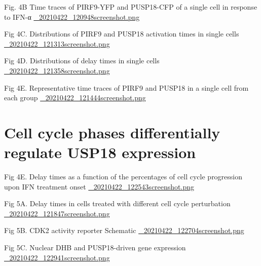 \documentclass[bigger]{beamer}
\begin{document}
\begin{frame}[label={sec:org4cd7d9c}]{Fig. 4B Time traces of PIRF9-YFP and PUSP18-CFP of a single cell in response to IFN-α}
\url{\_20210422\_120948screenshot.png}
\end{frame}

\begin{frame}[label={sec:org922249b}]{Fig 4C. Distributions of PIRF9 and PUSP18 activation times in single cells}
\url{\_20210422\_121313screenshot.png}
\end{frame}

\begin{frame}[label={sec:org0d51d52}]{Fig 4D. Distributions of delay times in single cells}
\url{\_20210422\_121358screenshot.png}
\end{frame}

\begin{frame}[label={sec:orgd564583}]{Fig 4E. Representative time traces of PIRF9 and PUSP18 in a single cell from each group}
\url{\_20210422\_121444screenshot.png}
\end{frame}

\section{Cell cycle phases differentially regulate USP18 expression}
\label{sec:orgb087d79}

\begin{frame}[label={sec:orgd25fd49}]{Fig 4E. Delay times as a function of the percentages of cell cycle progression upon IFN treatment onset}
\url{\_20210422\_122543screenshot.png}
\end{frame}


\begin{frame}[label={sec:org02ab943}]{Fig 5A. Delay times in cells treated with different cell cycle perturbation}
\url{\_20210422\_121847screenshot.png}
\end{frame}



\begin{frame}[label={sec:org5cb66c2}]{Fig 5B. CDK2 activity reporter Schematic}
\url{\_20210422\_122704screenshot.png}
\end{frame}

\begin{frame}[label={sec:org03944c5}]{Fig 5C. Nuclear DHB and PUSP18-driven gene expression}
\url{\_20210422\_122941screenshot.png}
\end{frame}
\end{document}
